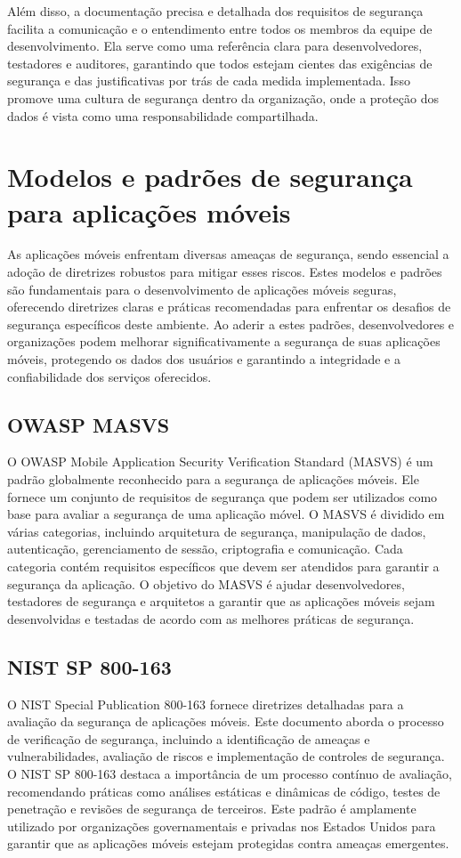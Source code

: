     Além disso, a documentação precisa e detalhada dos requisitos de segurança facilita a comunicação e o entendimento entre todos os membros da equipe de desenvolvimento. Ela serve como uma referência clara para desenvolvedores, testadores e auditores, garantindo que todos estejam cientes das exigências de segurança e das justificativas por trás de cada medida implementada. Isso promove uma cultura de segurança dentro da organização, onde a proteção dos dados é vista como uma responsabilidade compartilhada.
    

    \section{Modelos e padrões de segurança para aplicações móveis}
    As aplicações móveis enfrentam diversas ameaças de segurança, sendo essencial a adoção de diretrizes robustos para mitigar esses riscos. Estes modelos e padrões são fundamentais para o desenvolvimento de aplicações móveis seguras, oferecendo diretrizes claras e práticas recomendadas para enfrentar os desafios de segurança específicos deste ambiente. Ao aderir a estes padrões, desenvolvedores e organizações podem melhorar significativamente a segurança de suas aplicações móveis, protegendo os dados dos usuários e garantindo a integridade e a confiabilidade dos serviços oferecidos.

    \subsection{OWASP MASVS}
    O OWASP Mobile Application Security Verification Standard (MASVS) \cite{masvs2019} é um padrão globalmente reconhecido para a segurança de aplicações móveis. Ele fornece um conjunto de requisitos de segurança que podem ser utilizados como base para avaliar a segurança de uma aplicação móvel. O MASVS é dividido em várias categorias, incluindo arquitetura de segurança, manipulação de dados, autenticação, gerenciamento de sessão, criptografia e comunicação. Cada categoria contém requisitos específicos que devem ser atendidos para garantir a segurança da aplicação. O objetivo do MASVS é ajudar desenvolvedores, testadores de segurança e arquitetos a garantir que as aplicações móveis sejam desenvolvidas e testadas de acordo com as melhores práticas de segurança.
    
    \subsection{NIST SP 800-163}
    O NIST Special Publication 800-163 \cite{Ogata2019} fornece diretrizes detalhadas para a avaliação da segurança de aplicações móveis. Este documento aborda o processo de verificação de segurança, incluindo a identificação de ameaças e vulnerabilidades, avaliação de riscos e implementação de controles de segurança. O NIST SP 800-163 destaca a importância de um processo contínuo de avaliação, recomendando práticas como análises estáticas e dinâmicas de código, testes de penetração e revisões de segurança de terceiros. Este padrão é amplamente utilizado por organizações governamentais e privadas nos Estados Unidos para garantir que as aplicações móveis estejam protegidas contra ameaças emergentes.


